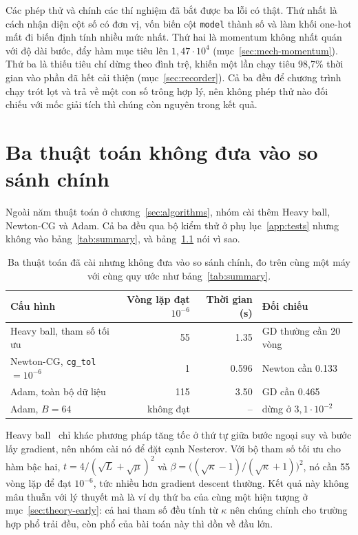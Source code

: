 Các phép thử và chính các thí nghiệm đã bắt được ba lỗi có thật. Thứ nhất là cách
nhận diện cột số có đơn vị, vốn biến cột \texttt{model} thành số và làm khối
one-hot mất đi biến định tính nhiều mức nhất. Thứ hai là momentum không nhất quán
với độ dài bước, đẩy hàm mục tiêu lên $1{,}47 \cdot 10^{4}$
(mục~\ref{sec:mech-momentum}). Thứ ba là thiếu tiêu chí dừng theo đình trệ, khiến
một lần chạy tiêu 98,7\% thời gian vào phần đã hết cải thiện
(mục~\ref{sec:recorder}). Cả ba đều để chương trình chạy trót lọt và trả về một
con số trông hợp lý, nên không phép thử nào đối chiếu với mốc giải tích thì chúng
còn nguyên trong kết quả.

\chapter{Ba thuật toán không đưa vào so sánh chính}
\label{app:cut}

Ngoài năm thuật toán ở chương~\ref{sec:algorithms}, nhóm cài thêm Heavy ball,
Newton-CG và Adam. Cả ba đều qua bộ kiểm thử ở phụ lục~\ref{app:tests} nhưng
không vào bảng~\ref{tab:summary}, và bảng~\ref{tab:cut} nói vì sao.

\begin{table}[tp]
  \centering
  \caption{Ba thuật toán đã cài nhưng không đưa vào so sánh chính, đo trên cùng
    một máy với cùng quy ước như bảng~\ref{tab:summary}.}
  \label{tab:cut}
  \begin{tabular}{lrrl}
    \toprule
    Cấu hình & Vòng lặp đạt $10^{-6}$ & Thời gian (s) & Đối chiếu \\
    \midrule
    Heavy ball, tham số tối ưu   & 55        & \num{1.35}  & GD thường cần 20 vòng \\
    Newton-CG, \texttt{cg\_tol} $= 10^{-6}$ & 1 & \num{0.596} & Newton cần \num{0.133} \\
    Adam, toàn bộ dữ liệu        & 115       & \num{3.50}  & GD cần \num{0.465} \\
    Adam, $B = 64$               & không đạt & --          & dừng ở $3{,}1 \cdot 10^{-2}$ \\
    \bottomrule
  \end{tabular}
\end{table}

Heavy ball~\cite{polyak1964heavyball} chỉ khác phương pháp tăng tốc ở thứ tự giữa
bước ngoại suy và bước lấy gradient, nên nhóm cài nó để đặt cạnh Nesterov. Với bộ tham số tối ưu cho hàm bậc
hai, $t = 4/(\sqrt{L}+\sqrt{\mu})^{2}$ và
$\beta = \bigl((\sqrt{\kappa}-1)/(\sqrt{\kappa}+1)\bigr)^{2}$, nó cần 55 vòng lặp
để đạt $10^{-6}$, tức nhiều hơn gradient descent thường. Kết quả này không mâu
thuẫn với lý thuyết mà là ví dụ thứ ba của cùng một hiện tượng ở
mục~\ref{sec:theory-early}: cả hai tham số đều tính từ $\kappa$ nên chúng chỉnh
cho trường hợp phổ trải đều, còn phổ của bài toán này thì dồn về đầu lớn.

